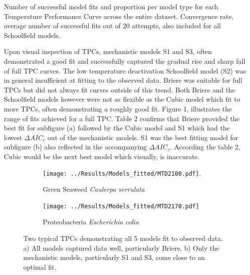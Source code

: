 \documentclass[11pt]{article}
\begin{document}
\begin{linenumbers}
\begin{table}[H]
\FloatBarrier
\centering
\caption{Number of successful model fits and proportion per model type for each Temperature Performance Curve across the entire dataset. Convergence rate, average number of successful fits out of 20 attempts, also included for all Schoolfield models.}
\begin{adjustbox}{height = 1.7cm, width=11cm}
\centering
 
\FloatBarrier
\end{adjustbox}
\end{table} 

Upon visual inspection of TPCs, mechanistic models S1 and S3, often demonstrated a good fit and successfully captured the gradual rise and sharp fall of full TPC curves. The low temperature deactivation Schoolfield model (S2) was in general insufficient at fitting to the observed data. Briere was suitable for full TPCs but did not always fit curves outside of this trend. Both Briere and the Schoolfield models however were not as flexible as the Cubic model which fit to more TPCs, often demonstrating a roughly good fit. Figure 1, illustrates the range of fits achieved for a full TPC. Table 2 confirms that Briere provided the best fit for subfigure (a) followed by the Cubic model and S1 which had the lowest \(\Delta AIC_c\) out of the mechanistic models. S1 was the best fitting model for subfigure (b) also reflected in the accompanying \(\Delta AIC_c\). According the table 2, Cubic would be the next best model which visually, is inaccurate.

\begin{figure}[H]
	\centering
	\begin{subfigure}{0.5\textwidth}
		\centering
		\texttt{[image: ../Results/Models\_fitted/MTD2100.pdf]}.
		\caption{Green Seaweed \textit{Caulerpa serrulata} }
		\label{fig:sub1}
	\end{subfigure}%
	\begin{subfigure}{0.5\textwidth}
		\centering
		\texttt{[image: ../Results/Models\_fitted/MTD2170.pdf]}
		\caption{ Proteobacteria \textit{Escherichia colia}}
		\label{fig:sub2}
	\end{subfigure}
	\caption{Two typical TPCs demonstrating all 5 models fit to observed data. a) All models captured data well, particularly Briere. b) Only the mechanistic models, particularly S1	and S3, come close to an optimal fit.}
	\label{fig:test}
\end{figure}




\end{linenumbers}
\end{document}
